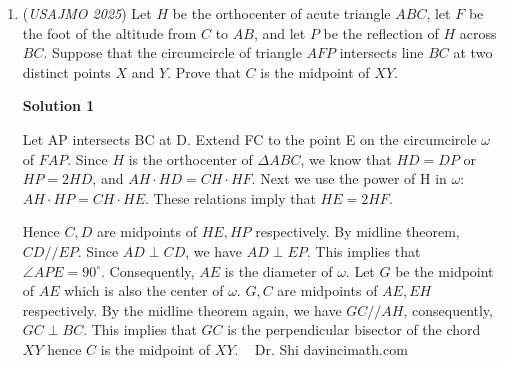 \begin{enumerate}
 Base case: $n=1$. Note that $\frac{1}{2}\binom{a_0+a_1}{2} \ge \frac{1}{2}\binom{a_1+a_1}{2} = 2a_1(2a_1-1)/4 \ge a_1(a_1-1)/2 = \binom{a_1}2$

 Inductive Hypothesis: Assume $\sum_{i=0}^n i\binom{a_i}{2}\le\frac{1}{2}\binom{a_0+a_1+\dots+a_n}{2}$

 Inductive Step: We try to show it works for $n+1$: $\sum_{i=0}^{n+1} i\binom{a_i}{2}\le\frac{1}{2}\binom{a_0+a_1+\dots+a_{n+1}}{2}$

 By the Inductive Hypothesis all we need to show is $(n+1)\binom{a_{n+1}}{2}\le \frac{1}{2}\binom{a_0+a_1+\dots+a_{n+1}}{2}-\frac{1}{2}\binom{a_0+a_1+\dots+a_{n}}{2}$

 Let $s=a_0+a_1+..+a_n$ and $c=a_{n+1}$. Now we need $(n+1)\binom{c}{2}\le \frac{1}{2}\binom{s+c}{2}-\frac{1}{2}\binom{s}{2}$. The LHS is $\frac{1}{2}(n+1)(c)(c-1)$ the RHS is $\frac{1}{4}(2sc+c^2-c)$. If $c=0$ we're done, otherwise we divide by $c$ and multiply by $4$ to get $2(n+1)(c-1)=2nc+2c-2n-2$ which we are trying to show is $\le 2s+c-1$. Note that $s\ge (n+1)c$ by the problem statement condition. So it simplifies to $2nc+2c-2n-2 \le 2nc+3c-1$ which is obvious.

 


	\item (\textit{USAJMO 2025}) Let $H$ be the orthocenter of acute triangle $ABC$, let $F$ be the foot of the altitude from $C$ to $AB$, and let $P$ be the reflection of $H$ across $BC$. Suppose that the circumcircle of triangle $AFP$ intersects line $BC$ at two distinct points $X$ and $Y$. Prove that $C$ is the midpoint of $XY$.


 



\textbf{Solution 1}

Let AP intersects BC at D. Extend FC to the point E on the circumcircle $\omega$ of $FAP$. Since $H$ is the orthocenter of $\Delta ABC$, we know that $HD = DP$ or $HP = 2HD$, and $AH \cdot HD = CH \cdot HF$. Next we use the power of H in $\omega$: $AH \cdot HP = CH \cdot HE$. These relations imply that $HE = 2HF$.

 Hence $C, D$ are midpoints of $HE, HP$ respectively. By midline theorem, $CD // EP$. Since $AD \perp CD$, we have $AD \perp EP$. This implies that $\angle APE = 90^{\circ}$. Consequently, $AE$ is the diameter of $\omega$. Let $G$ be the midpoint of $AE$ which is also the center of $\omega$. $G,C$ are midpoints of $AE, EH$ respectively. By the midline theorem again, we have $GC//AH$, consequently, $GC \perp BC$. This implies that $GC$ is the perpendicular bisector of the chord $XY$ hence $C$ is the midpoint of $XY$.    ~ Dr. Shi davincimath.com


\end{enumerate}
